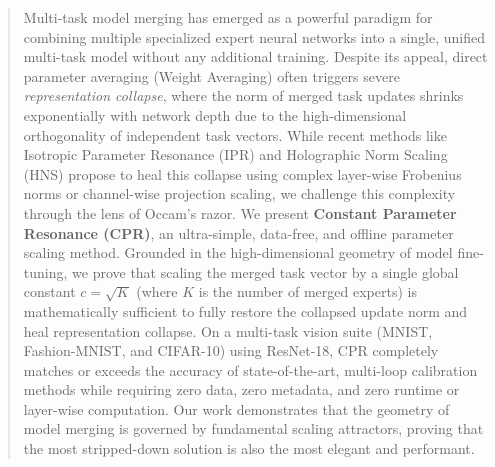 \documentclass{article}
\theoremstyle{plain}
\theoremstyle{definition}
\theoremstyle{remark}
\begin{document}

\printAffiliationsAndNotice{}

\begin{abstract}
Multi-task model merging has emerged as a powerful paradigm for combining multiple specialized expert neural networks into a single, unified multi-task model without any additional training. Despite its appeal, direct parameter averaging (Weight Averaging) often triggers severe \emph{representation collapse}, where the norm of merged task updates shrinks exponentially with network depth due to the high-dimensional orthogonality of independent task vectors. While recent methods like Isotropic Parameter Resonance (IPR) and Holographic Norm Scaling (HNS) propose to heal this collapse using complex layer-wise Frobenius norms or channel-wise projection scaling, we challenge this complexity through the lens of Occam's razor. We present \textbf{Constant Parameter Resonance (CPR)}, an ultra-simple, data-free, and offline parameter scaling method. Grounded in the high-dimensional geometry of model fine-tuning, we prove that scaling the merged task vector by a single global constant $c = \sqrt{K}$ (where $K$ is the number of merged experts) is mathematically sufficient to fully restore the collapsed update norm and heal representation collapse. On a multi-task vision suite (MNIST, Fashion-MNIST, and CIFAR-10) using ResNet-18, CPR completely matches or exceeds the accuracy of state-of-the-art, multi-loop calibration methods while requiring zero data, zero metadata, and zero runtime or layer-wise computation. Our work demonstrates that the geometry of model merging is governed by fundamental scaling attractors, proving that the most stripped-down solution is also the most elegant and performant.
\end{abstract}
\end{document}

